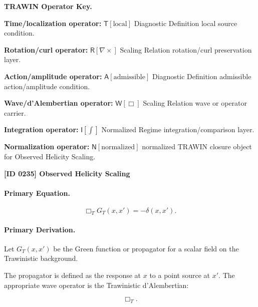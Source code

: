 \par\vspace{0.45\baselineskip}
\noindent\begin{minipage}[t]{\linewidth}
\begingroup
\small
\raggedright
\textbf{TRAWIN Operator Key.}\par
\noindent\textbf{Time/localization operator:} $\mathsf{T}\!\left[\mathrm{local}\right]$ Diagnostic Definition local source condition.\par
\noindent\textbf{Rotation/curl operator:} $\mathsf{R}\!\left[\nabla\times\right]$ Scaling Relation rotation/curl preservation layer.\par
\noindent\textbf{Action/amplitude operator:} $\mathsf{A}\!\left[\mathrm{admissible}\right]$ Diagnostic Definition admissible action/amplitude condition.\par
\noindent\textbf{Wave/d'Alembertian operator:} $\mathsf{W}\!\left[\Box\right]$ Scaling Relation wave or operator carrier.\par
\noindent\textbf{Integration operator:} $\mathsf{I}\!\left[\int\right]$ Normalized Regime integration/comparison layer.\par
\noindent\textbf{Normalization operator:} $\mathsf{N}\!\left[\mathrm{normalized}\right]$ normalized TRAWIN closure object for Observed Helicity Scaling.\par
\endgroup
\end{minipage}

\clearpage
\noindent\textbf{[ID 0235] Observed Helicity Scaling}\par
\vspace{0.35em}
\paragraph{Primary Equation.}
\begin{equation}
\Box_T G_T(x,x')
=
-\delta(x,x') .
\end{equation}

\paragraph{Primary Derivation.}
Let $G_T(x,x')$ be the Green function or propagator for a scalar field on the Trawinistic background.

The propagator is defined as the response at $x$ to a point source at $x'$.  
The appropriate wave operator is the Trawinistic d'Alembertian:

\begin{equation}
\Box_T .
\end{equation}

